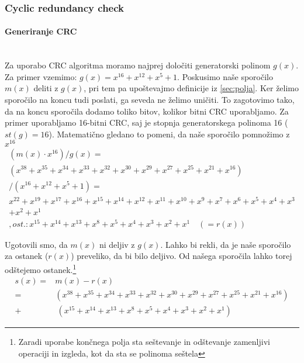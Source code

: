 \documentclass[12pt]{article}
\begin{document}
        \subsubsection{Cyclic redundancy check}
            \paragraph{Generiranje CRC} \mbox{}\\
            Za uporabo CRC algoritma moramo najprej določiti generatorski 
            polinom $g(x)$. Za primer vzemimo: $g(x)=x^{16}+x^{12}+x^5+1$.
            Poskusimo naše sporočilo $m(x)$ deliti z $g(x)$, pri tem pa 
            upoštevajmo definicije iz \ref{sec:polja}.
            Ker želimo sporočilo na koncu tudi poslati, ga seveda ne želimo 
            uničiti. To zagotovimo tako, da na koncu sporočila dodamo toliko
            bitov, kolikor bitni CRC uporabljamo. Za primer uporabljamo 16-bitni
            CRC, saj je stopnja generatorskega polinoma 16 ($st(g)=16$). 
            Matematično gledano to pomeni, da naše sporočilo pomnožimo z 
            $x^{16}$ 
            \begin{equation}
                \begin{split}
                    (m(x) \cdot x^{16})/g(x) =\\
                    (x^{38} + x^{35} + x^{34} + x^{33} + x^{32} +
                    x^{30} + x^{29} + x^{27} + x^{25} + x^{21} + x^{16})\\
                    /(x^{16} +x^{12} + x^5 + 1)=\\
                    x^{22} + x^{19} + x^{17} + x^{16} + x^{15} +
                    x^{14} + x^{12} + x^{11} + x^{10} + x^{9} + x^{7} + 
                    x^{6} + x^{5} + x^{4} + x^{3}\\ + x^{2} + x^{1}\\
                    , ost.: x^{15} + x^{14} + x^{13} + x^8 + x^5 + x^4 + x^3 + 
                    x^2 + x^1 \quad (=r(x))
                \end{split}
            \end{equation}

            Ugotovili smo, da $m(x)$ ni deljiv z $g(x)$. Lahko bi rekli, da je 
            naše sporočilo za ostanek ($r(x)$) preveliko, da bi bilo deljivo. 
            Od našega sporočila lahko torej odštejemo ostanek.\footnote{Zaradi 
            uporabe končnega polja sta seštevanje in odštevanje zamenljivi 
            operaciji in izgleda, kot da sta se polinoma seštela}
            \begin{equation}
                \begin{split}
                    s(x) = & m(x) - r(x)\\
                    = & (x^{38} + x^{35} + x^{34} + x^{33} + x^{32} +
                    x^{30} + x^{29} + x^{27} + x^{25} + x^{21} + x^{16})\\
                    + & \: (x^{15} + x^{14} + x^{13} + x^8 + x^5 + x^4 + x^3 + 
                    x^2 + x^1)                    
                \end{split}
            \end{equation}
\end{document}
